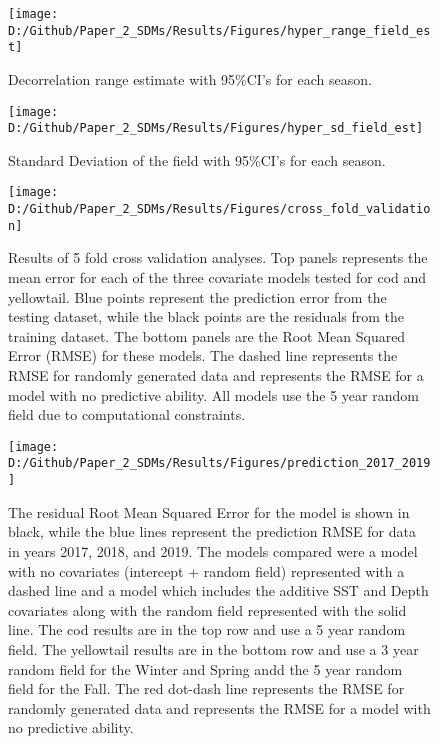 \documentclass[
]{article}
\begin{document}
\begin{landscape}
\clearpage

\begin{figure}
\texttt{[image: D:/Github/Paper\_2\_SDMs/Results/Figures/hyper\_range\_field\_est]} \caption{Decorrelation range estimate with 95\%CI's for each season.}\label{fig:hyper-range-var-est}
\end{figure}

\clearpage

\begin{figure}
\texttt{[image: D:/Github/Paper\_2\_SDMs/Results/Figures/hyper\_sd\_field\_est]} \caption{Standard Deviation of the field with 95\%CI's for each season.}\label{fig:hyper-sd-var-est}
\end{figure}

\newpage
\begin{figure}
\texttt{[image: D:/Github/Paper\_2\_SDMs/Results/Figures/cross\_fold\_validation]} \caption{Results of 5 fold cross validation analyses. Top panels represents the mean error for each of the three covariate models tested for cod and yellowtail. Blue points represent the prediction error from the testing dataset, while the black points are the residuals from the training dataset. The bottom panels are the Root Mean Squared Error (RMSE) for these models.  The dashed line represents the RMSE for randomly generated data and represents the RMSE for a model with no predictive ability. All models use the 5 year random field due to computational constraints.}\label{fig:folds}
\end{figure}

\newpage
\begin{figure}
\texttt{[image: D:/Github/Paper\_2\_SDMs/Results/Figures/prediction\_2017\_2019]} \caption{The residual Root Mean Squared Error for the model is shown in black, while the blue lines represent the prediction RMSE for data in years 2017, 2018, and 2019. The models compared were a model with no covariates (intercept + random field) represented with a dashed line and a model which includes the additive SST and Depth covariates along with the random field represented with the solid line.  The cod results are in the top row and use a 5 year random field. The yellowtail results are in the bottom row and use a 3 year random field for the Winter and Spring andd the 5 year random field for the Fall. The red dot-dash line represents the RMSE for randomly generated data and represents the RMSE for a model with no predictive ability.}\label{fig:pred-17-19}
\end{figure}

\end{landscape}
\end{document}
